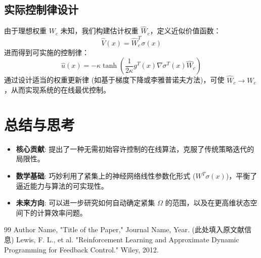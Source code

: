 \documentclass[a4paper,12pt]{article}
\newcommand{\trans}{^T}
\begin{document}
\subsection{实际控制律设计}
由于理想权重 $W_c$ 未知，我们构建估计权重 $\hat{W}_c$，定义近似价值函数：
\begin{equation}
    \hat{V}(x) = \hat{W}_c\trans \sigma(x)
\end{equation}
进而得到可实施的控制律：
\begin{equation}
    \hat{u}(x) = -\kappa \tanh \left( \frac{1}{2\kappa} g\trans(x) \nabla \sigma\trans(x) \hat{W}_c \right)
\end{equation}
通过设计适当的权重更新律 (如基于梯度下降或李雅普诺夫方法)，可使 $\hat{W}_c \to W_c$，从而实现系统的在线最优控制。

\section{总结与思考}
\begin{itemize}
    \item \textbf{核心贡献}: 提出了一种无需初始容许控制的在线算法，克服了传统策略迭代的局限性。
    \item \textbf{数学基础}: 巧妙利用了紧集上的神经网络线性参数化形式 ($W^T \sigma(x)$)，平衡了逼近能力与算法的可实现性。
    \item \textbf{未来方向}: 可以进一步研究如何自动确定紧集 $\Omega$ 的范围，以及在更高维状态空间下的计算效率问题。
\end{itemize}

\begin{thebibliography}{99}
     Author Name, "Title of the Paper," Journal Name, Year. (此处填入原文献信息)
     Lewis, F. L., et al. "Reinforcement Learning and Approximate Dynamic Programming for Feedback Control." Wiley, 2012.
\end{thebibliography}
\end{document}

